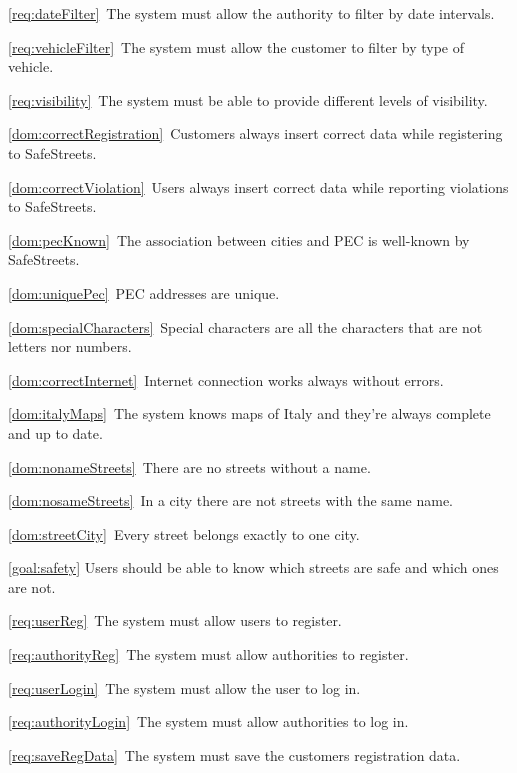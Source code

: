 \begin{description}
\begin{description}
\begin{description}
							\item \ref{req:dateFilter}\ The system must allow the authority to filter by date intervals.
							\item \ref{req:vehicleFilter}\ The system must allow the customer to filter by type of vehicle.
							\item \ref{req:visibility}\ The system must be able to provide different levels of visibility.
							\item \ref{dom:correctRegistration}\ Customers always insert correct data while registering to SafeStreets.
							\item \ref{dom:correctViolation}\ Users always insert correct data while reporting violations to SafeStreets.
							\item \ref{dom:pecKnown}\ The association between cities and PEC is well-known by SafeStreets.
							\item \ref{dom:uniquePec}\ PEC addresses are unique.
							\item \ref{dom:specialCharacters}\ Special characters are all the characters that are not letters nor numbers.
							\item \ref{dom:correctInternet}\ Internet connection works always without errors.
							\item \ref{dom:italyMaps}\ The system knows maps of Italy and they’re always complete and up to date.
							\item \ref{dom:nonameStreets}\ There are no streets without a name.
							\item \ref{dom:nosameStreets}\ In a city there are not streets with the same name.
							\item \ref{dom:streetCity}\ Every street belongs exactly to one city.
						\end{description}
				\end{description}
			\item \ref{goal:safety} Users should be able to know which streets are safe and which ones are not.
				\begin{description}
					\item \ref{req:userReg}\ The system must allow users to register.
					\item \ref{req:authorityReg}\ The system must allow authorities to register.
					\item \ref{req:userLogin}\ The system must allow the user to log in.
					\item \ref{req:authorityLogin}\ The system must allow authorities to log in.
					\item \ref{req:saveRegData}\ The system must save the customers registration data.

\end{description}
\end{description}
